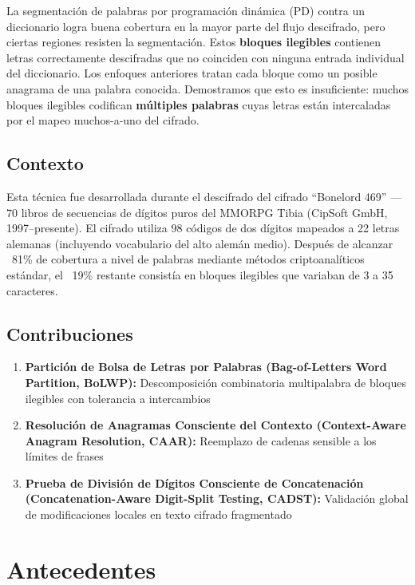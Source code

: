 \documentclass[11pt,a4paper]{article}
\begin{document}
La segmentación de palabras por programación dinámica (PD) contra un diccionario logra buena cobertura en la mayor parte del flujo descifrado, pero ciertas regiones resisten la segmentación. Estos \textbf{bloques ilegibles} contienen letras correctamente descifradas que no coinciden con ninguna entrada individual del diccionario. Los enfoques anteriores tratan cada bloque como un posible anagrama de una palabra conocida. Demostramos que esto es insuficiente: muchos bloques ilegibles codifican \textbf{múltiples palabras} cuyas letras están intercaladas por el mapeo muchos-a-uno del cifrado.

\subsection{Contexto}

Esta técnica fue desarrollada durante el descifrado del cifrado ``Bonelord 469'' --- 70 libros de secuencias de dígitos puros del MMORPG Tibia (CipSoft GmbH, 1997–presente). El cifrado utiliza 98 códigos de dos dígitos mapeados a 22 letras alemanas (incluyendo vocabulario del alto alemán medio). Después de alcanzar ~81\% de cobertura a nivel de palabras mediante métodos criptoanalíticos estándar, el ~19\% restante consistía en bloques ilegibles que variaban de 3 a 35 caracteres.

\subsection{Contribuciones}

\begin{enumerate}
\item \textbf{Partición de Bolsa de Letras por Palabras (Bag-of-Letters Word Partition, BoLWP):} Descomposición combinatoria multipalabra de bloques ilegibles con tolerancia a intercambios
\item \textbf{Resolución de Anagramas Consciente del Contexto (Context-Aware Anagram Resolution, CAAR):} Reemplazo de cadenas sensible a los límites de frases
\item \textbf{Prueba de División de Dígitos Consciente de Concatenación (Concatenation-Aware Digit-Split Testing, CADST):} Validación global de modificaciones locales en texto cifrado fragmentado
\end{enumerate}

\section{Antecedentes}
\end{document}
